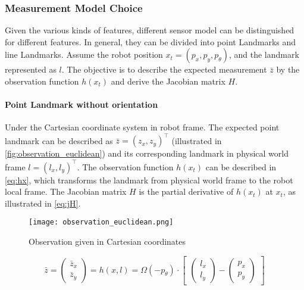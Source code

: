 \subsubsection{Measurement Model Choice}\label{subsub:sensorModelChoice}
Given the various kinds of features, different sensor model can be distinguished for different features. In general, they can be divided into point Landmarks and line Landmarks. Assume the robot position $x_t = (p_x, p_y, p_{\theta})$, and the landmark represented as $l$. The objective is to describe the expected measurement $\bar{z}$ by the observation function $h(x_t)$ and derive the Jacobian matrix $H$.
\paragraph{Point Landmark without orientation}\label{par:pointLandmark}
Under the Cartesian coordinate system in robot frame. The expected point landmark can be described as $\bar{z} = (z_x, z_y)^\top$ (illustrated in \autoref{fig:observation_euclidean}) and its corresponding landmark in physical world frame $l = (l_x, l_y)^\top$. The observation function $h(x_t)$ can be described in \autoref{eq:hx}, which transforms the landmark from physical world frame to the robot local frame. The Jacobian matrix $H$ is the partial derivative of $h(x_t)$ at $x_t$, as illustrated in \autoref{eq:jH}. 

\begin{figure}[h!]
  \centering
  \texttt{[image: observation\_euclidean.png]}
  \caption{Observation given in Cartesian coordinates \cite{Tasse2013}}
  \label{fig:observation_euclidean}
\end{figure}

\begin{equation}\label{eq:hx}
  \bar{z} = \begin{pmatrix}
\bar{z}_{x}\\ 
\bar{z}_{y}
\end{pmatrix}
= 
h(x, l)
=
\Omega(-p_{\theta})
\cdot
\begin{bmatrix}
 \begin{pmatrix}
l_{x}\\ 
l_{y}
\end{pmatrix}
-
\begin{pmatrix}
p_{x}\\ 
p_{y}
\end{pmatrix}
\end{bmatrix}
\end{equation}

